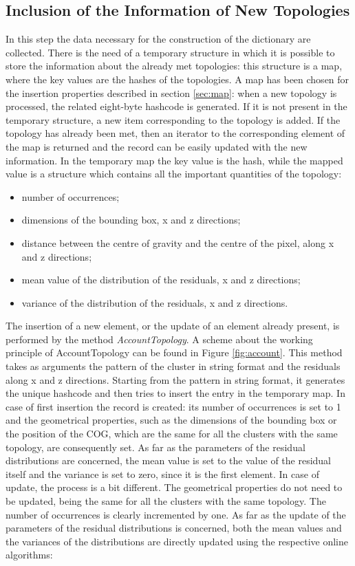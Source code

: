\subsection{Inclusion of the Information of New Topologies}
In this step the data necessary for the construction of the dictionary are collected. There is the need of a temporary structure in which it is possible to store the information about the already met topologies: this structure is a map, where the key values are the hashes of the topologies.  A map has been chosen for the insertion properties described in section \ref{sec:map}: when a new topology is processed, the related eight-byte hashcode is generated. If it is not present in the temporary structure, a new item corresponding to the topology is added. If the topology has already been met, then an iterator to the corresponding element of the map is returned and the record can be easily updated with the new information. In the temporary map the key value is the hash, while the mapped value is a structure which contains all the important quantities of the topology:
\begin{itemize}
 \item number of occurrences;
 \item dimensions of the bounding box, x and z directions;
 \item distance between the centre of gravity and the centre of the pixel, along x and z directions;
 \item mean value of the distribution of the residuals, x and z directions;
 \item variance of the distribution of the residuals, x and z directions.
\end{itemize}
The insertion of a new element, or the update of an element already present, is performed by the method \textit{AccountTopology}. A scheme about the working principle of AccountTopology can be found in Figure \ref{fig:account}. This method takes as arguments the pattern of the cluster in string format and the residuals along x and z directions. Starting from the pattern in string format, it  generates the unique hashcode and then tries to insert the entry in the temporary map. In case of first insertion the record is created: its number of occurrences is set to 1 and the geometrical properties, such as the dimensions of the bounding box or the position of the COG, which are the same for all the clusters with the same topology, are consequently set. As far as the parameters of the residual distributions are concerned, the mean value is set to the value of the residual itself and the variance is set to zero, since it is the first element. In case of update, the process is a bit different. The geometrical properties do not need to be updated, being the same for all the clusters with the same topology. The number of occurrences is clearly incremented by one. As far as the update of the parameters of the residual distributions is concerned, both the mean values and the variances of the distributions are directly updated using the respective online algorithms:
